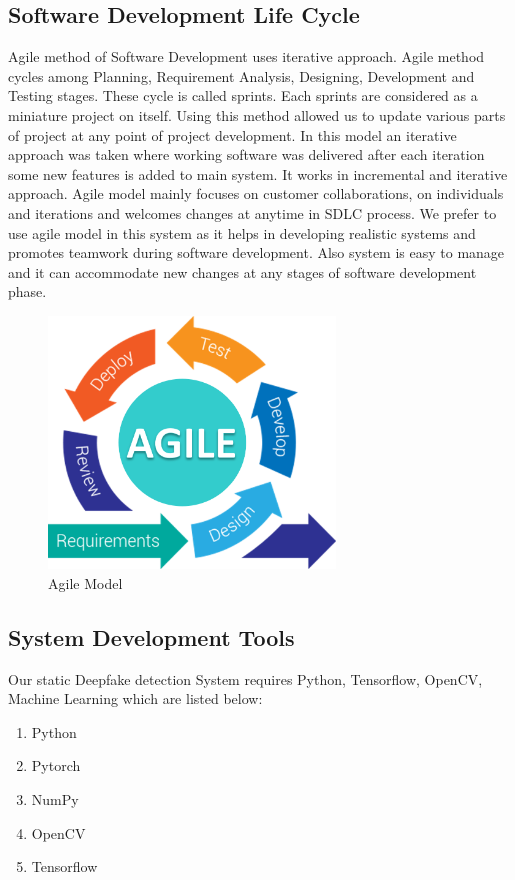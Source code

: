 \documentclass[12 pt]{article}
\begin{document}
\subsection{Software Development Life Cycle}
\justify
Agile method of Software Development uses iterative approach. Agile method cycles
among Planning, Requirement Analysis, Designing, Development and Testing stages.
These cycle is called sprints. Each sprints are considered as a miniature project on itself.
Using this method allowed us to update various parts of project at any point of project
development. In this model an iterative approach was taken where working software
was delivered after each iteration some new features is added to main system. It works
in incremental and iterative approach. Agile model mainly focuses on customer
collaborations, on individuals and iterations and welcomes changes at anytime in
SDLC process. We prefer to use agile model in this system as it helps in developing
realistic systems and promotes teamwork during software development. Also system is
easy to manage and it can accommodate new changes at any stages of software
development phase. \\
\vspace{0.2 in}
\begin{figure}[h]
    \centering
    \includegraphics[width= 3in ]{agile.png}
    \caption{Agile Model}
\end{figure}

\newpage
\subsection{System Development Tools}
Our static Deepfake detection System requires Python, Tensorflow, OpenCV,
Machine Learning which are listed below:
\begin{enumerate}
    \item Python
    \item Pytorch
    \item NumPy
    \item OpenCV
    \item Tensorflow
\end{enumerate}
\end{document}
